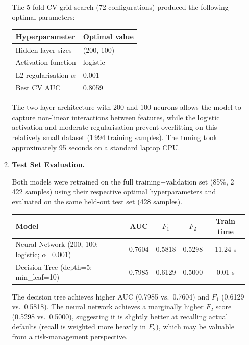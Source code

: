 \documentclass[a4paper,12pt]{article}
\begin{document}
\begin{enumerate}
\begin{enumerate}[label=(\alph*)]
\noindent The 5-fold CV grid search (72 configurations) produced the following optimal
parameters:

\begin{center}
\begin{tabular}{ll}
\toprule
Hyperparameter & Optimal value \\
\midrule
Hidden layer sizes & (200, 100) \\
Activation function & logistic \\
L2 regularisation $\alpha$ & $0.001$ \\
Best CV AUC & 0.8059 \\
\bottomrule
\end{tabular}
\end{center}

The two-layer architecture with 200 and 100 neurons allows the model to capture
non-linear interactions between features, while the logistic activation and moderate
regularisation prevent overfitting on this relatively small dataset (1\,994 training
samples). The tuning took approximately 95 seconds on a standard laptop CPU.

\item \textbf{Test Set Evaluation.}

Both models were retrained on the full training$+$validation set (85\%, 2\,422 samples)
using their respective optimal hyperparameters and evaluated on the same held-out test set
(428 samples).

\begin{center}
\begin{tabular}{lcccc}
\toprule
Model & AUC & $F_1$ & $F_2$ & Train time \\
\midrule
Neural Network (200, 100; logistic; $\alpha$=0.001) & 0.7604 & 0.5818 & 0.5298 & 11.24 s \\
Decision Tree (depth=5; min\_leaf=10)               & 0.7985 & 0.6129 & 0.5000 &  0.01 s \\
\bottomrule
\end{tabular}
\end{center}

\noindent The decision tree achieves higher AUC (0.7985 vs.\ 0.7604) and $F_1$ (0.6129
vs.\ 0.5818). The neural network achieves a marginally higher $F_2$ score (0.5298 vs.\
0.5000), suggesting it is slightly better at recalling actual defaults (recall is weighted
more heavily in $F_2$), which may be valuable from a risk-management perspective.


\end{enumerate}
\end{enumerate}
\end{document}
